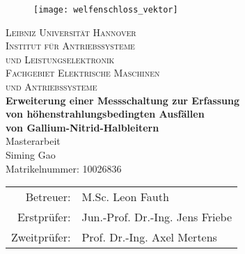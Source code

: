 \begin{titlepage}
\enlargethispage{2.0cm}

\begin{center}

\vspace*{-2cm}


   \begin{figure}[h]
   \centering
       \texttt{[image: welfenschloss\_vektor]}
   \end{figure}

\vspace{1cm}

    {\LARGE \textsc{Leibniz Universität Hannover}}\\[1.0cm]

    {\Large \textsc{Institut für Antriebssysteme}} \\[0.2cm]
    {\Large \textsc{und Leistungselektronik}} \\ [0.4cm]

    {\Large \textsc{Fachgebiet Elektrische Maschinen}} \\ [0.2cm]
		{\Large \textsc{und Antriebssysteme}} \\ [1.7cm]

    {\Large \textbf{Erweiterung einer Messschaltung zur Erfassung\\[0.3cm]von höhenstrahlungsbedingten Ausfällen\\[0.3cm]von Gallium-Nitrid-Halbleitern } } \\ [3cm]

    {\Large Masterarbeit} \\ [1.5cm]

    {\large Siming Gao} \\
    {Matrikelnummer: 10026836 } \\ [1.5cm]

    \begin{tabular}{rl}
      Betreuer:    & M.Sc. Leon Fauth\\
      Erstprüfer:  & Jun.-Prof. Dr.-Ing. Jens Friebe\\
      Zweitprüfer: & Prof. Dr.-Ing. Axel Mertens
    \end{tabular}

\end{center}

\end{titlepage}
